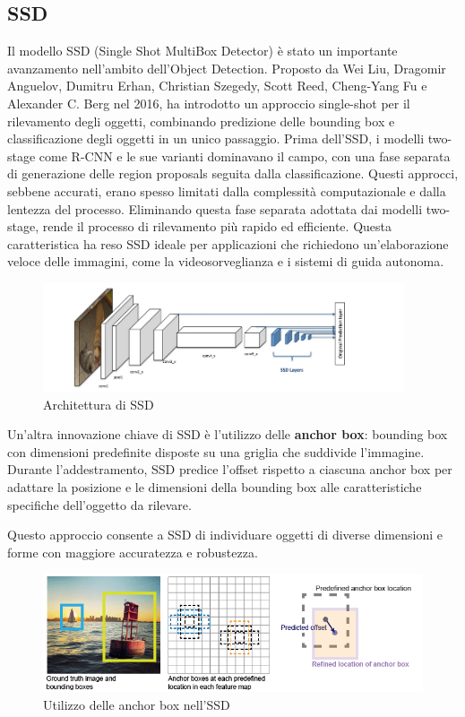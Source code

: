 \newpage

\subsection{SSD}
Il modello SSD (Single Shot MultiBox Detector) è stato un importante avanzamento nell'ambito dell'Object Detection. Proposto da Wei Liu, Dragomir Anguelov, Dumitru Erhan, Christian Szegedy, Scott Reed, Cheng-Yang Fu e Alexander C. Berg nel 2016\cite{11}, ha introdotto un approccio single-shot per il rilevamento degli oggetti, combinando predizione delle bounding box e classificazione degli oggetti in un unico passaggio. Prima dell'SSD, i modelli two-stage come R-CNN e le sue varianti dominavano il campo, con una fase separata di generazione delle region proposals seguita dalla classificazione. Questi approcci, sebbene accurati, erano spesso limitati dalla complessità computazionale e dalla lentezza del processo.
Eliminando questa fase separata adottata dai modelli two-stage, rende il processo di rilevamento più rapido ed efficiente. Questa caratteristica ha reso SSD ideale per applicazioni che richiedono un'elaborazione veloce delle immagini, come la videosorveglianza e i sistemi di guida autonoma.

\begin{figure}[ht]
    \centering
    \includegraphics[width=0.95\textwidth]{files/capitoli/1-object-detection/assets/ssd.png}
    \caption{\label{fig:ssd}Architettura di SSD\cite{12}}
\end{figure}

Un'altra innovazione chiave di SSD è l'utilizzo delle \textbf{anchor box}: bounding box con dimensioni predefinite disposte su una griglia che suddivide l'immagine. Durante l'addestramento, SSD predice l'offset rispetto a ciascuna anchor box per adattare la posizione e le dimensioni della bounding box alle caratteristiche specifiche dell'oggetto da rilevare.

Questo approccio consente a SSD di individuare oggetti di diverse dimensioni e forme con maggiore accuratezza e robustezza.

\begin{figure}[ht]
    \centering
    \includegraphics[width=1\textwidth]{files/capitoli/1-object-detection/assets/ssd-anchors.png}
    \caption{\label{fig:ssd-anchors}Utilizzo delle anchor box nell'SSD\cite{13}}
\end{figure}

